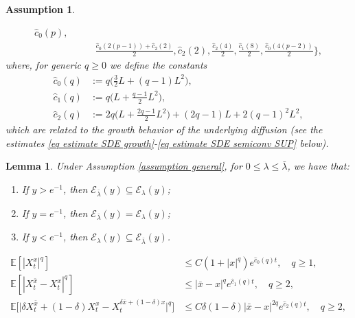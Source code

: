 \documentclass[10pt,a4paper]{amsart}
\newtheorem{assumption}{Assumption}
\newtheorem{lemma}{Lemma}
\begin{document}
\begin{assumption}
\begin{enumerate}
$$\begin{aligned}
     \hat c _0 (p), \\
    & \qquad  \frac{\hat c _0 ( 2(p-1))+ \hat c _2(2)}{2}, 
    \hat c _2 (2),
    \frac{\hat c _2 (4)}2, 
    \frac{\hat c _1 (8)}{2}, 
    \frac{\hat c _0 ( 4(p-2))}{2} \Big\},
    \end{aligned}
    $$
    where, for generic $q \geq 0$ we define the constants
    \begin{equation}\label{eq definition constants}
    \begin{aligned}
        \hat c _0(q) &:= q \Big(\frac32 L + (q-1) L^2 \Big), \\
        \hat c _1(q) &:= q \Big(L+\frac{q-1}{2}L^2 \Big), \\
        \hat c _2 (q)& := {2 q\Big(L+\frac{2 q-1}{2} L^{2}\Big) }+ {(2 q-1) L+2(q-1)^{2} L^{2}}, 
    \end{aligned}
    \end{equation}
    which are related to the growth behavior of the underlying diffusion (see the estimates \eqref{eq estimate SDE growth}-\eqref{eq estimate SDE semiconv SUP} below).
    \end{enumerate}
\end{assumption}

\begin{lemma}
    \label{lemma monotonicity boundary} 
    Under Assumption \ref{assumption general}, for $0\leq \lambda \leq \bar \lambda$, we have that:
    \begin{enumerate}
        \item If $y > e^{-1}$, then  $\mathcal E_{\bar \lambda} (y) \subseteq   \mathcal E_{ \lambda} (y)$;
        \item If $y=e^{-1}$, then $\mathcal E_{\bar \lambda}(y) = \mathcal E_{ \lambda} (y) $;
        \item If $ y<e^{-1}$, then $ \mathcal E_{ \lambda} (y) \subseteq   \mathcal E_{\bar \lambda} (y) $.
    \end{enumerate}
\end{lemma}

\begin{align}
\label{eq estimate SDE growth} 
\mathbb{E}[ |  X ^x_t |^{q} ]  & \leq C (1+|x|^q) e^{  \hat c _0(q) t}, \quad q\geq 1,   \\ 
\label{eq estimate SDE Lip} \mathbb{E}[ |  X^{\bar x}_t - X ^x_t |^{q} ] & \leq |\bar{x} - x|^q e^{  \hat c _1(q) t} , \quad q\geq 2, \\ 
 \label{eq estimate SDE semiconv} 
 \mathbb{E} \big[  \big|  \delta X^{\bar x}_t + (1-\delta) X^x_t - X ^{\delta \bar x + (1-\delta) x}_t \big|^q \big] & \leq C \delta (1-\delta) |\bar{x} - x|^{2q} e^{  \hat c _2(q) t}, \quad q \geq 2,
\end{align}
\end{document}
